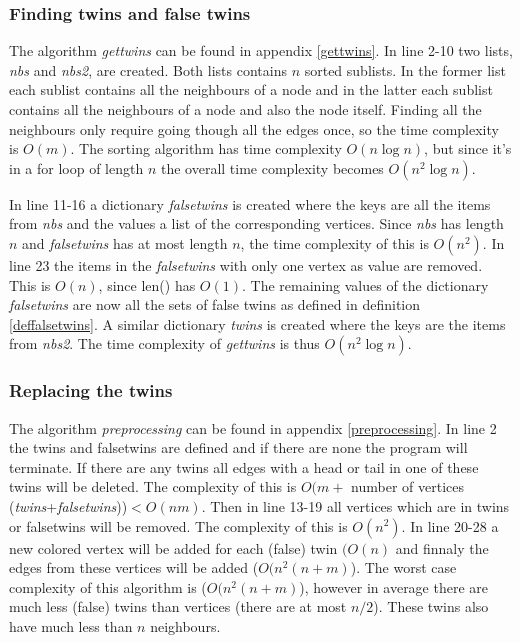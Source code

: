 \documentclass[twoside]{article}
\theoremstyle{definition}
\theoremstyle{plain}
\begin{document}
\begin{multicols}{2}
\subsubsection{Finding twins and false twins}
The algorithm \emph{gettwins} can be found in appendix \ref{gettwins}. In line 2-10 two lists, \emph{nbs} and \emph{nbs2}, are created. Both lists contains $n$ sorted sublists. In the former list each sublist contains all the neighbours of a node and in the latter each sublist contains all the neighbours of a node and also the node itself. Finding all the neighbours only require going though all the edges once, so the time complexity is $O(m)$. The sorting algorithm has time complexity $O(n \log n)$, but since it's in a for loop of length $n$ the overall time complexity becomes $O(n^2 \log n)$. 

In line 11-16 a dictionary \emph{falsetwins} is created where the keys are all the items from \emph{nbs} and the values a list of the corresponding vertices. Since \emph{nbs} has length $n$ and \emph{falsetwins} has at most length $n$, the time complexity of this is $O(n^2)$. In line 23 the items in the \emph{falsetwins} with only one vertex as value are removed. This is $O(n)$, since len() has $O(1)$.\cite{website:pythonTimeComplexity} The remaining values of the dictionary \emph{falsetwins} are now all the sets of false twins as defined in definition \ref{deffalsetwins}. A similar dictionary \emph{twins} is created where the keys are the items from \emph{nbs2}. The time complexity of \textit{gettwins} is thus $O(n^2 \log n)$.


\subsubsection{Replacing the twins}
The algorithm \emph{preprocessing} can be found in appendix \ref{preprocessing}. In line 2 the twins and falsetwins are defined and if there are none the program will terminate. If there are any twins all edges with a head or tail in one of these twins will be deleted. The complexity of this is $O(m +$ number of vertices (\emph{twins}+\emph{falsetwins}))$ < O (nm)$. Then in line 13-19 all vertices which are in twins or falsetwins will be removed. The complexity of this is $O(n^2)$. In line 20-28 a new colored vertex will be added for each (false) twin $(O(n)$ and finnaly the edges from these vertices will be added ($O(n^2 (n+m)$). The worst case complexity of this algorithm is ($O(n^2 (n+m)$), however in average there are much less (false) twins than vertices (there are at most $n/2$). These twins also have much less than $n$ neighbours.


\end{multicols}
\end{document}
